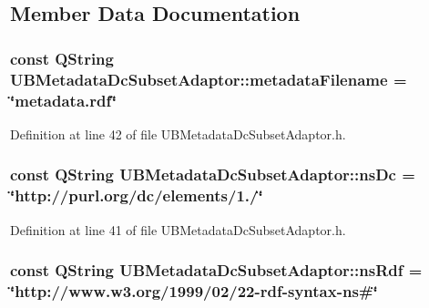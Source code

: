 \subsection{Member Data Documentation}
\hypertarget{class_u_b_metadata_dc_subset_adaptor_a3fe2af997e91f30c44dfe05abd9d8a8a}{
\subsubsection[{metadata\-Filename}]{\setlength{\rightskip}{0pt plus 5cm}const Q\-String U\-B\-Metadata\-Dc\-Subset\-Adaptor\-::metadata\-Filename = \char`\"{}metadata.\-rdf\char`\"{}\hspace{0.3cm}{\ttfamily [static]}}}\label{dc/d51/class_u_b_metadata_dc_subset_adaptor_a3fe2af997e91f30c44dfe05abd9d8a8a}


Definition at line 42 of file U\-B\-Metadata\-Dc\-Subset\-Adaptor.\-h.

\hypertarget{class_u_b_metadata_dc_subset_adaptor_ab2fcd74a28b766ed49f99854dde7892d}{
\subsubsection[{ns\-Dc}]{\setlength{\rightskip}{0pt plus 5cm}const Q\-String U\-B\-Metadata\-Dc\-Subset\-Adaptor\-::ns\-Dc = \char`\"{}http\-://purl.\-org/dc/elements/1./\char`\"{}\hspace{0.3cm}{\ttfamily [static]}}}\label{dc/d51/class_u_b_metadata_dc_subset_adaptor_ab2fcd74a28b766ed49f99854dde7892d}


Definition at line 41 of file U\-B\-Metadata\-Dc\-Subset\-Adaptor.\-h.

\hypertarget{class_u_b_metadata_dc_subset_adaptor_aa595874193416df84e99eabbd3cd2071}{
\subsubsection[{ns\-Rdf}]{\setlength{\rightskip}{0pt plus 5cm}const Q\-String U\-B\-Metadata\-Dc\-Subset\-Adaptor\-::ns\-Rdf = \char`\"{}http\-://www.\-w3.\-org/1999/02/22-\/rdf-\/syntax-\/ns\#\char`\"{}\hspace{0.3cm}{\ttfamily [static]}}}\label{dc/d51/class_u_b_metadata_dc_subset_adaptor_aa595874193416df84e99eabbd3cd2071}


